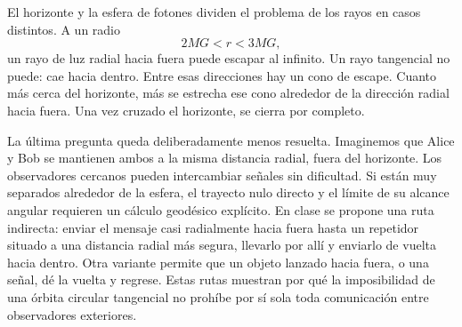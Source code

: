 El horizonte y la esfera de fotones dividen el problema de los rayos en casos distintos. A un radio
\begin{equation}
2MG<r<3MG,
\end{equation}
un rayo de luz radial hacia fuera puede escapar al infinito. Un rayo tangencial no puede: cae hacia dentro. Entre esas direcciones hay un cono de escape. Cuanto más cerca del horizonte, más se estrecha ese cono alrededor de la dirección radial hacia fuera. Una vez cruzado el horizonte, se cierra por completo.

\begin{classroomqa}
\end{classroomqa}

\begin{classroomqa}
\end{classroomqa}

La última pregunta queda deliberadamente menos resuelta. Imaginemos que Alice y Bob se mantienen ambos a la misma distancia radial, fuera del horizonte. Los observadores cercanos pueden intercambiar señales sin dificultad. Si están muy separados alrededor de la esfera, el trayecto nulo directo y el límite de su alcance angular requieren un cálculo geodésico explícito. En clase se propone una ruta indirecta: enviar el mensaje casi radialmente hacia fuera hasta un repetidor situado a una distancia radial más segura, llevarlo por allí y enviarlo de vuelta hacia dentro. Otra variante permite que un objeto lanzado hacia fuera, o una señal, dé la vuelta y regrese. Estas rutas muestran por qué la imposibilidad de una órbita circular tangencial no prohíbe por sí sola toda comunicación entre observadores exteriores.


